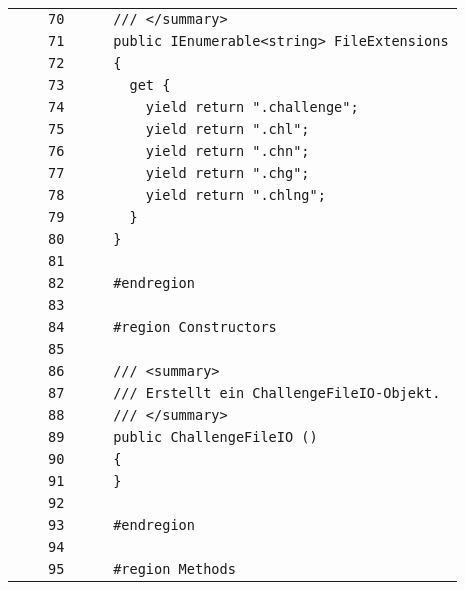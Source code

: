 \documentclass[a4paper,10pt]{article}
\begin{document}
\begin{longtable}[l]{lrrl}
\cellcolor{gray} &  & \verb~70~ & \verb~    /// </summary>~\\
\cellcolor{gray} &  & \verb~71~ & \verb~    public IEnumerable<string> FileExtensions~\\
\cellcolor{gray} &  & \verb~72~ & \verb~    {~\\
\cellcolor{gray} &  & \verb~73~ & \verb~      get {~\\
\cellcolor{gray} &  & \verb~74~ & \verb~        yield return ".challenge";~\\
\cellcolor{gray} &  & \verb~75~ & \verb~        yield return ".chl";~\\
\cellcolor{gray} &  & \verb~76~ & \verb~        yield return ".chn";~\\
\cellcolor{gray} &  & \verb~77~ & \verb~        yield return ".chg";~\\
\cellcolor{gray} &  & \verb~78~ & \verb~        yield return ".chlng";~\\
\cellcolor{gray} &  & \verb~79~ & \verb~      }~\\
\cellcolor{gray} &  & \verb~80~ & \verb~    }~\\
\cellcolor{gray} &  & \verb~81~ & \verb~~\\
\cellcolor{gray} &  & \verb~82~ & \verb~    #endregion~\\
\cellcolor{gray} &  & \verb~83~ & \verb~~\\
\cellcolor{gray} &  & \verb~84~ & \verb~    #region Constructors~\\
\cellcolor{gray} &  & \verb~85~ & \verb~~\\
\cellcolor{gray} &  & \verb~86~ & \verb~    /// <summary>~\\
\cellcolor{gray} &  & \verb~87~ & \verb~    /// Erstellt ein ChallengeFileIO-Objekt.~\\
\cellcolor{gray} &  & \verb~88~ & \verb~    /// </summary>~\\
\cellcolor{gray} &  & \verb~89~ & \verb~    public ChallengeFileIO ()~\\
\cellcolor{gray} &  & \verb~90~ & \verb~    {~\\
\cellcolor{gray} &  & \verb~91~ & \verb~    }~\\
\cellcolor{gray} &  & \verb~92~ & \verb~~\\
\cellcolor{gray} &  & \verb~93~ & \verb~    #endregion~\\
\cellcolor{gray} &  & \verb~94~ & \verb~~\\
\cellcolor{gray} &  & \verb~95~ & \verb~    #region Methods~\\

\end{longtable}
\end{document}
